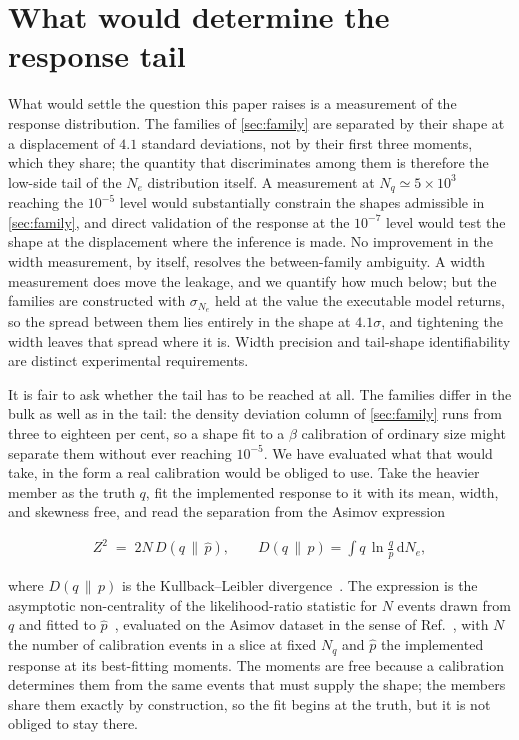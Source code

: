 \documentclass[11pt,a4paper]{article}
\begin{document}
\section{What would determine the response tail}
\label{sec:settle}

What would settle the question this paper raises is a measurement of the response
distribution. The families of \cref{sec:family} are separated by their
shape at a displacement of \(4.1\) standard deviations, not by their
first three moments, which they share; the quantity that discriminates
among them is therefore the low-side tail of the \(N_e\) distribution
itself. A measurement at \(N_q\simeq5\times10^{3}\) reaching the
\(10^{-5}\) level would substantially constrain the shapes admissible
in \cref{sec:family}, and direct validation of the response at the
\(10^{-7}\) level would test the shape at the displacement where the
inference is made. No improvement in the width measurement, by itself,
resolves the between-family ambiguity. A width measurement does move the
leakage, and we quantify how much below; but the families are
constructed with \(\sigma_{N_e}\) held at the value the executable model
returns, so the spread between them lies entirely in the shape at
\(4.1\sigma\), and tightening the width leaves that spread where it is.
Width precision and tail-shape identifiability are distinct experimental
requirements.

It is fair to ask whether the tail has to be reached at all. The
families differ in the bulk as well as in the tail: the density
deviation column of \cref{sec:family} runs from three to eighteen per
cent, so a shape fit to a \(\beta\) calibration of ordinary size might
separate them without ever reaching \(10^{-5}\). We have evaluated what
that would take, in the form a real calibration would be obliged to use.
Take the heavier member as the truth \(q\), fit the implemented response
to it with its mean, width, and skewness free, and read the separation
from the Asimov expression

\begin{align}
Z^{2} \;=\; 2N\,D\!\left(q\,\|\,\hat{p}\right),
\qquad
D(q\,\|\,p)=\int q\,\ln\!\frac{q}{p}\,\mathrm{d}N_e ,
\label{eq:asimov}
\end{align}

\noindent where \(D(q\,\|\,p)\) is the Kullback--Leibler
divergence~\cite{Kullback:1951}. The expression is the asymptotic
non-centrality of the likelihood-ratio statistic for \(N\) events drawn
from \(q\) and fitted to \(\hat p\)~\cite{Wilks,Asimov}, evaluated on
the Asimov dataset in the sense of Ref.~\cite{Asimov}, with \(N\) the
number of calibration events in a slice at fixed \(N_q\) and \(\hat{p}\)
the implemented response at its best-fitting moments. The moments are
free because a calibration determines them from the same events that
must supply the shape; the members share them exactly by construction,
so the fit begins at the truth, but it is not obliged to stay there.
\end{document}
